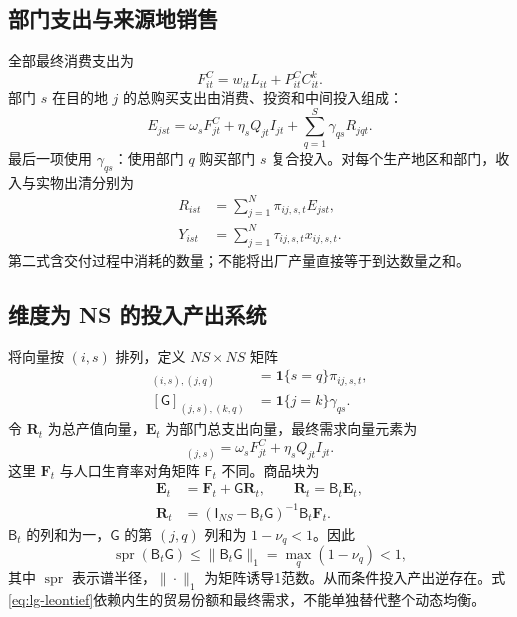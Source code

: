 \documentclass[UTF8,a4paper,zihao=-4,fontset=windows]{ctexart}
\numberwithin{equation}{section}
\newcommand{\pc}{P^{C}}
\newcommand{\invp}{Q}
\newcommand{\Id}{\mathsf{I}}
\DeclareMathOperator{\spr}{spr}
\begin{document}
\subsection{部门支出与来源地销售}
全部最终消费支出为
\begin{equation}
 F^C_{it}=w_{it}L_{it}+\pc_{it}C^k_{it}.
 \label{eq:lg-final-consumption}
\end{equation}
部门 $s$ 在目的地 $j$ 的总购买支出由消费、投资和中间投入组成：
\begin{equation}
 E_{jst}=\omega_sF^C_{jt}+\eta_s\invp_{jt}I_{jt}
 +\sum_{q=1}^S\gamma_{qs}R_{jqt}.
 \label{eq:lg-sector-expenditure}
\end{equation}
最后一项使用 $\gamma_{qs}$：使用部门 $q$ 购买部门 $s$ 复合投入。对每个生产地区和部门，收入与实物出清分别为
\begin{align}
 R_{ist}&=\sum_{j=1}^N\pi_{ij,s,t}E_{jst},
 \label{eq:lg-revenue-clearing}\\
 Y_{ist}&=\sum_{j=1}^N\tau_{ij,s,t}x_{ij,s,t}.
 \label{eq:lg-physical-clearing}
\end{align}
第二式含交付过程中消耗的数量；不能将出厂产量直接等于到达数量之和。

\subsection{维度为 NS 的投入产出系统}
将向量按 $(i,s)$ 排列，定义 $NS\times NS$ 矩阵
\begin{align}
 [\mathsf B_t]_{(i,s),(j,q)}&=\mathbf1\{s=q\}\pi_{ij,s,t},\\
 [\mathsf G]_{(j,s),(k,q)}&=\mathbf1\{j=k\}\gamma_{qs}.
\end{align}
令 $\bm R_t$ 为总产值向量，$\bm E_t$ 为部门总支出向量，最终需求向量元素为
\begin{equation}
 [\bm F_t]_{(j,s)}=\omega_sF^C_{jt}+\eta_s\invp_{jt}I_{jt}.
\end{equation}
这里 $\bm F_t$ 与人口生育率对角矩阵 $\mathsf F_t$ 不同。商品块为
\begin{align}
 \bm E_t&=\bm F_t+\mathsf G\bm R_t,\qquad
 \bm R_t=\mathsf B_t\bm E_t,\\
 \bm R_t&=(\Id_{NS}-\mathsf B_t\mathsf G)^{-1}\mathsf B_t\bm F_t.
 \label{eq:lg-leontief}
\end{align}
$\mathsf B_t$ 的列和为一，$\mathsf G$ 的第 $(j,q)$ 列和为 $1-\nu_q<1$。因此
\begin{equation}
 \spr(\mathsf B_t\mathsf G)\leq\|\mathsf B_t\mathsf G\|_1
 =\max_q(1-\nu_q)<1,
 \label{eq:lg-io-inverse}
\end{equation}
其中 $\spr$ 表示谱半径，$\|\cdot\|_1$ 为矩阵诱导1范数。从而条件投入产出逆存在。式\eqref{eq:lg-leontief}依赖内生的贸易份额和最终需求，不能单独替代整个动态均衡。
\end{document}
